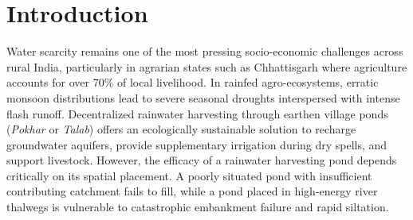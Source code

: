 \documentclass[manuscript,screen,review]{acmart}
\begin{document}

\maketitle

\begin{center}
\noindent{}
\end{center}
\vspace{2mm}
\section{Introduction}
\label{sec:intro}
Water scarcity remains one of the most pressing socio-economic challenges across rural India, particularly in agrarian states such as Chhattisgarh where agriculture accounts for over 70\% of local livelihood. In rainfed agro-ecosystems, erratic monsoon distributions lead to severe seasonal droughts interspersed with intense flash runoff. Decentralized rainwater harvesting through earthen village ponds (\textit{Pokhar} or \textit{Talab}) offers an ecologically sustainable solution to recharge groundwater aquifers, provide supplementary irrigation during dry spells, and support livestock. However, the efficacy of a rainwater harvesting pond depends critically on its spatial placement. A poorly situated pond with insufficient contributing catchment fails to fill, while a pond placed in high-energy river thalwegs is vulnerable to catastrophic embankment failure and rapid siltation. 
\end{document}
